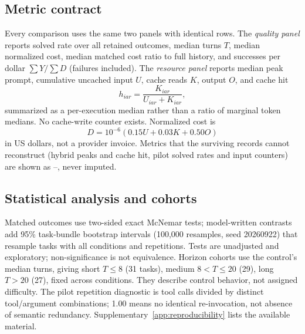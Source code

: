 \subsection{Metric contract}
Every comparison uses the same two panels with identical rows.
The \emph{quality panel} reports solved rate over all retained outcomes,
median turns $T$, median normalized cost, median matched cost ratio to
full history, and successes per dollar $\sum Y/\sum D$ (failures included).
The \emph{resource panel} reports median peak prompt, cumulative uncached
input $U$, cache reads $K$, output $O$, and cache hit
\begin{equation}
 h_{iar}=\frac{K_{iar}}{U_{iar}+K_{iar}},
 \label{eq:cache-hit}
\end{equation}
summarized as a per-execution median rather than a ratio of marginal
token medians. No cache-write counter exists. Normalized cost is
\begin{equation}
 D=10^{-6}(0.15U+0.03K+0.50O)
 \label{eq:referencecost}
\end{equation}
in US dollars, not a provider invoice. Metrics that the surviving records
cannot reconstruct (hybrid peaks and cache hit, pilot solved rates and input
counters) are shown as --, never imputed.

\subsection{Statistical analysis and cohorts}
Matched outcomes use two-sided exact McNemar tests; model-written contrasts
add 95\% task-bundle bootstrap intervals (100,000 resamples, seed
20260922) that resample tasks with all conditions and repetitions.
Tests are unadjusted and exploratory; non-significance is not equivalence.
Horizon cohorts use the control's median turns, giving short $T\leq8$ (31 tasks),
medium $8<T\leq20$ (29), long $T>20$ (27), fixed across conditions. They
describe control behavior, not assigned difficulty. The pilot repetition
diagnostic is tool calls divided by distinct tool/argument combinations; 1.00 means
no identical re-invocation, not absence of semantic redundancy.
Supplementary~\ref{app:reproducibility} lists the available material.
